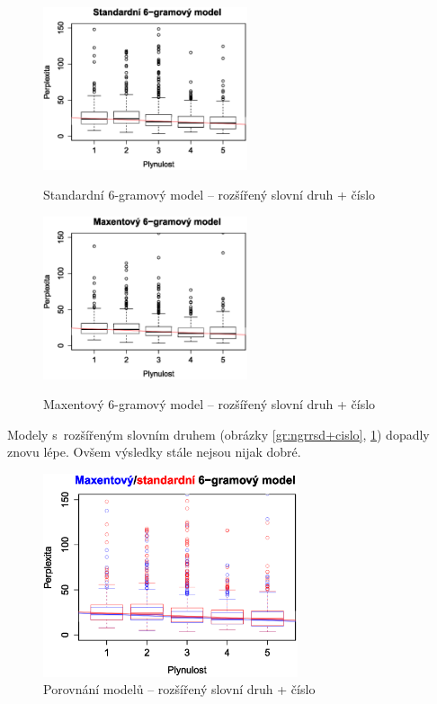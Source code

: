 \documentclass[12pt,a4paper]{report}
\begin{document}


\begin{figure}[!htb]
\begin{center}
  \centering\includegraphics[width=60mm]{./grafy/morf/ngram/rsd+cislo.svg.eps}
  \caption{Standardní 6-gramový model -- rozšířený slovní druh + číslo}\label{gr:ngrrsd+cislo}
\endminipage\quad
{}
  \centering\includegraphics[width=60mm]{./grafy/morf/maxent/rsd+cislo.svg.eps}
  \caption{Maxentový 6-gramový model -- rozšířený slovní druh + číslo}\label{gr:maxrsd+cislo}
\endminipage
\end{center}
\end{figure}




Modely s~rozšířeným slovním druhem (obrázky \ref{gr:ngrrsd+cislo}, \ref{gr:maxrsd+cislo}) dopadly znovu lépe. Ovšem výsledky stále nejsou nijak dobré.

\begin{figure}[!htbp]
\begin{center}
	\centering
	\includegraphics[width=75mm]{./grafy/morf/porovnani/rsd+cislo.svg.eps}		
	\caption{Porovnání modelů -- rozšířený slovní druh + číslo}\label{gr:porrsd+cislo}
\endminipage
\end{center}
\end{figure}
\end{document}
